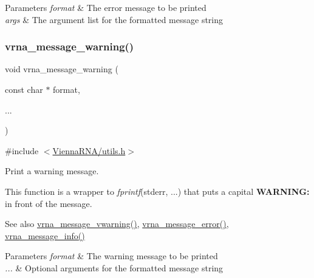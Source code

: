 \begin{DoxyParams}{Parameters}
{\em format} & The error message to be printed \\
\hline
{\em args} & The argument list for the formatted message string \\
\hline
\end{DoxyParams}
\mbox{\label{group__utils_ga6e07ed24add60693ba886d54d0a46635}} 
\subsubsection{\texorpdfstring{vrna\+\_\+message\+\_\+warning()}{vrna\_message\_warning()}}
{\footnotesize\ttfamily void vrna\+\_\+message\+\_\+warning (\begin{DoxyParamCaption}\item[{const char $\ast$}]{format,  }\item[{}]{... }\end{DoxyParamCaption})}



{\ttfamily \#include $<$\hyperlink{utils_8h}{Vienna\+R\+N\+A/utils.\+h}$>$}



Print a warning message. 

This function is a wrapper to {\itshape fprintf}(stderr, ...) that puts a capital {\bfseries W\+A\+R\+N\+I\+NG\+:} in front of the message.

\begin{DoxySeeAlso}{See also}
\hyperlink{group__utils_ga377aa8ec8a49d343063adb22e6311f26}{vrna\+\_\+message\+\_\+vwarning()}, \hyperlink{group__utils_ga36b35be01d7f36cf7f59c245eee628d1}{vrna\+\_\+message\+\_\+error()}, \hyperlink{group__utils_ga039bae6153a6415b054dbe6045f83d03}{vrna\+\_\+message\+\_\+info()}
\end{DoxySeeAlso}

\begin{DoxyParams}{Parameters}
{\em format} & The warning message to be printed \\
\hline
{\em ...} & Optional arguments for the formatted message string \\
\hline
\end{DoxyParams}
\mbox{\label{group__utils_ga377aa8ec8a49d343063adb22e6311f26}} 
